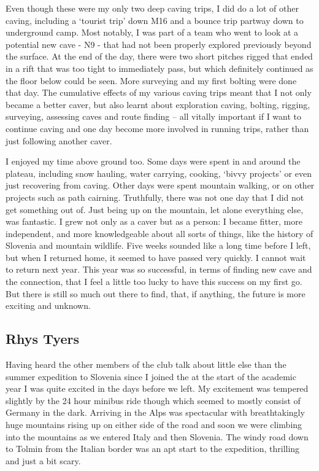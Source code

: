 Even though these were my only two deep caving trips, I did do a lot of other caving, including a ‘tourist trip’ down M16 and a bounce trip partway down to underground camp. Most notably, I was part of a team who went to look at a potential new cave - N9 - that had not been properly explored previously beyond the surface. At the end of the day, there were two short pitches rigged that ended in a rift that was too tight to immediately pass, but which definitely continued as the floor below could be seen. More surveying and my first bolting were done that day. The cumulative effects of my various caving trips meant that I not only became a better caver, but also learnt about exploration caving, bolting, rigging, surveying, assessing caves and route finding – all vitally important if I want to continue caving and one day become more involved in running trips, rather than just following another caver.

I enjoyed my time above ground too. Some days were spent in and around the plateau, including snow hauling, water carrying, cooking, ‘bivvy projects’ or even just recovering from caving. Other days were spent mountain walking, or on other projects such as path cairning. Truthfully, there was not one day that I did not get something out of. Just being up on the mountain, let alone everything else, was fantastic. I grew not only as a caver but as a person: I became fitter, more independent, and more knowledgeable about all sorts of things, like the history of Slovenia and mountain wildlife. Five weeks sounded like a long time before I left, but when I returned home, it seemed to have passed very quickly. I cannot wait to return next year. This year was so successful, in terms of finding new cave and the connection, that I feel a little too lucky to have this success on my first go. But there is still so much out there to find, that, if anything, the future is more exciting and unknown.

\subsection {Rhys Tyers}

Having heard the other members of the club talk about little else  than the summer expedition to Slovenia since I joined the at the start of the academic year I was quite excited in the days before we left. My excitement was tempered slightly by the 24 hour minibus ride though which seemed to mostly consist of Germany in the dark. Arriving in the Alps was spectacular with breathtakingly huge mountains rising up on either side of the road and soon we were climbing into the mountains as we entered Italy and then Slovenia. The windy road down to Tolmin from the Italian border was an apt start to the expedition, thrilling and just a bit scary.

